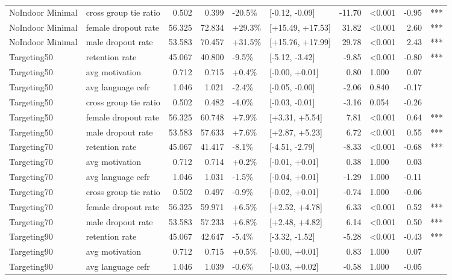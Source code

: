 \begin{longtable}[t]{llrrllrlrl}
\addlinespace
NoIndoor Minimal & cross group tie ratio & 0.502 & 0.399 & -20.5\% & {}[-0.12, -0.09] & -11.70 & <0.001 & -0.95 & ***\\
NoIndoor Minimal & female dropout rate & 56.325 & 72.834 & +29.3\% & {}[+15.49, +17.53] & 31.82 & <0.001 & 2.60 & ***\\
NoIndoor Minimal & male dropout rate & 53.583 & 70.457 & +31.5\% & {}[+15.76, +17.99] & 29.78 & <0.001 & 2.43 & ***\\
Targeting50 & retention rate & 45.067 & 40.800 & -9.5\% & {}[-5.12, -3.42] & -9.85 & <0.001 & -0.80 & ***\\
Targeting50 & avg motivation & 0.712 & 0.715 & +0.4\% & {}[-0.00, +0.01] & 0.80 & 1.000 & 0.07 & \\
\addlinespace
Targeting50 & avg language cefr & 1.046 & 1.021 & -2.4\% & {}[-0.05, -0.00] & -2.06 & 0.840 & -0.17 & \\
Targeting50 & cross group tie ratio & 0.502 & 0.482 & -4.0\% & {}[-0.03, -0.01] & -3.16 & 0.054 & -0.26 & \\
Targeting50 & female dropout rate & 56.325 & 60.748 & +7.9\% & {}[+3.31, +5.54] & 7.81 & <0.001 & 0.64 & ***\\
Targeting50 & male dropout rate & 53.583 & 57.633 & +7.6\% & {}[+2.87, +5.23] & 6.72 & <0.001 & 0.55 & ***\\
Targeting70 & retention rate & 45.067 & 41.417 & -8.1\% & {}[-4.51, -2.79] & -8.33 & <0.001 & -0.68 & ***\\
\addlinespace
Targeting70 & avg motivation & 0.712 & 0.714 & +0.2\% & {}[-0.01, +0.01] & 0.38 & 1.000 & 0.03 & \\
Targeting70 & avg language cefr & 1.046 & 1.031 & -1.5\% & {}[-0.04, +0.01] & -1.29 & 1.000 & -0.11 & \\
Targeting70 & cross group tie ratio & 0.502 & 0.497 & -0.9\% & {}[-0.02, +0.01] & -0.74 & 1.000 & -0.06 & \\
Targeting70 & female dropout rate & 56.325 & 59.971 & +6.5\% & {}[+2.52, +4.78] & 6.33 & <0.001 & 0.52 & ***\\
Targeting70 & male dropout rate & 53.583 & 57.233 & +6.8\% & {}[+2.48, +4.82] & 6.14 & <0.001 & 0.50 & ***\\
\addlinespace
Targeting90 & retention rate & 45.067 & 42.647 & -5.4\% & {}[-3.32, -1.52] & -5.28 & <0.001 & -0.43 & ***\\
Targeting90 & avg motivation & 0.712 & 0.715 & +0.5\% & {}[-0.00, +0.01] & 0.83 & 1.000 & 0.07 & \\
Targeting90 & avg language cefr & 1.046 & 1.039 & -0.6\% & {}[-0.03, +0.02] & -0.58 & 1.000 & -0.05 & \\

\end{longtable}
